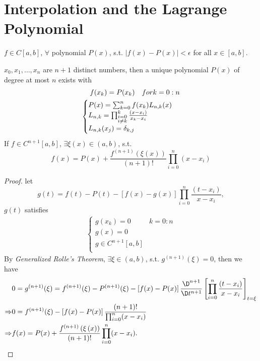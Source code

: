 \section{Interpolation and the Lagrange Polynomial}

\begin{theo}
$f\in C[a,b]$, $\forall$ polynomial $P(x)$, s.t. $\left|f(x)-P(x)\right|<\epsilon$ for all $x\in [a,b]$.
\end{theo}

\begin{theo}
$x_0,x_1,\ldots,x_n$ are $n+1$ distinct numbers, then a unique polynomial $P(x)$ of degree at most $n$ exists with
\begin{align*}
  f(x_k)=P(x_k)\quad for\space k=0:n \\
  \begin{cases}
    P(x)=\sum_{k=0}^{n}f(x_k)L_{n,k}(x) \\
    L_{n,k}=\prod_{\substack{i=0\\i\neq k}}^{k}\frac{(x-x_i)}{x_k-x_i} \\
    L_{n,k}(x_j)=\delta_{k,j}
  \end{cases}
\end{align*}
If $f\in C^{n+1}[a,b]$, $\exists\xi(x)\in (a,b)$, s.t.
\[
f(x) = P(x) + \frac{f^{(n+1)}\left(\xi\left(x\right)\right)}{(n+1)!}\prod_{i=0}^{n}(x-x_i)
\]
\end{theo}

\begin{proof}
let \[g(t)=f(t)-P(t)-\left[f(x)-g(x)\right]\prod_{i=0}^{n}\frac{(t-x_i)}{x-x_i},\]
$g(t)$ satisfies
\begin{align*}
  \begin{cases}
  g(x_k)=0 & k=0:n\\
  g(x)=0 & \\
  g\in C^{n+1}[a,b] \\
  \end{cases}
\end{align*}
By \emph{Generalized Rolle's Theorem}, $\exists\xi\in (a,b)$, s.t. $g^{(n+1)}(\xi)=0$, then we have
\begin{align*}
& 0 = g^{(n+1)}(\xi)=f^{(n+1)}(\xi)-P^{(n+1)}(\xi)-\left[f(x)-P(x)\right]\frac{\D^{n+1}}{\D t^{n+1}}\left[\prod_{i=0}^{n}\frac{(t-x_i)}{x-x_i}\right]_{t=\xi} \\
\Rightarrow & 0 = f^{(n+1)}(\xi)-\left[f(x)-P(x)\right]\frac{(n+1)!}{\prod_{i=0}^{n}(x-x_i)} \\
\Rightarrow & f(x) = P(x) + \frac{f^{(n+1)}\left(\xi\left(x\right)\right)}{(n+1)!}\prod_{i=0}^{n}(x-x_i).
\end{align*}
\end{proof} 
